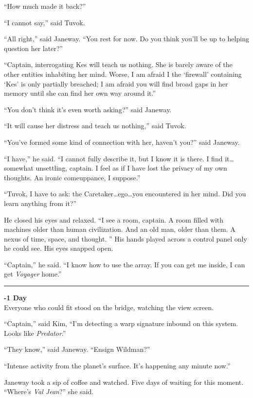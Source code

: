 \documentclass[twoside,letterpaper,12pt]{memoir}
\begin{document}
``How much made it back?'' 

``I cannot say,'' said Tuvok. 

``All right,'' said Janeway. ``You rest for now. Do you think you'll be up to helping question her later?'' 

``Captain, interrogating Kes will teach us nothing. She is barely aware of the other entities inhabiting her mind. Worse, I am afraid I the `firewall' containing `Kes' is only partially breached; I am afraid you will find broad gaps in her memory until she can find her own way around it.'' 

``You don't think it's even worth asking?'' said Janeway. 

``It will cause her distress and teach us nothing,'' said Tuvok. 

``You've formed some kind of connection with her, haven't you?'' said Janeway. 

``I have,'' he said. ``I cannot fully describe it, but I know it is there. I find it\ldots somewhat unsettling, captain. I feel as if I have lost the privacy of my own thoughts. An ironic comeuppance, I suppose.'' 

``Tuvok, I have to ask: the Caretaker\ldots ego\ldots you encountered in her mind. Did you learn anything from it?'' 

He closed his eyes and relaxed. ``I see a room, captain. A room filled with machines older than human civilization. And an old man, older than them. A nexus of time, space, and thought. '' His hands played across a control panel only he could see. His eyes snapped open. 

``Captain,'' he said. ``I know how to use the array. If you can get me inside, I can get \textit{Voyager} home.'' 

\fancybreak{\rule{3cm}{0.4 pt}} 

\noindent\textbf{-1 Day}\\

Everyone who could fit stood on the bridge, watching the view screen. 

``Captain,'' said Kim, ``I'm detecting a warp signature inbound on this system. Looks like \textit{Predator}.'' 

``They know,'' said Janeway. ``Ensign Wildman?'' 

``Intense activity from the planet's surface. It's happening any minute now.'' 

Janeway took a sip of coffee and watched. Five days of waiting for this moment. ``Where's \textit{Val Jean}?'' she said. 
\end{document}

